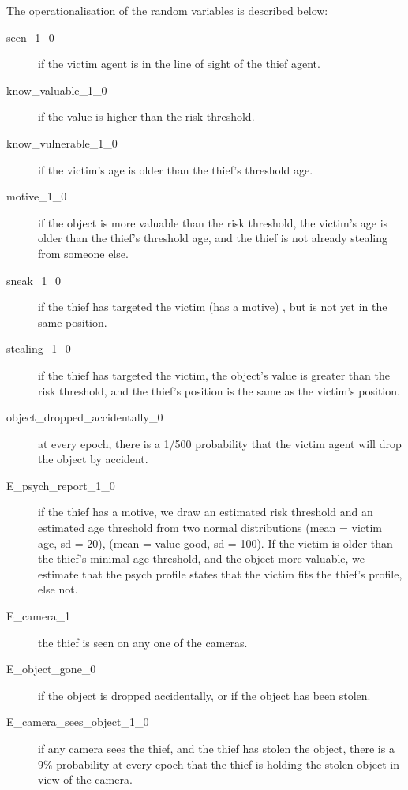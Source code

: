 The operationalisation of the random variables is described below:
\begin{description}


\item[seen\_1\_0  ] if the victim agent is in the line of sight of the thief agent.
\item[know\_valuable\_1\_0 ] if the value is higher than the risk threshold.
\item[know\_vulnerable\_1\_0  ] if the victim's age is older than the thief's threshold age.
\item[motive\_1\_0 ] if the object is more valuable than the risk threshold, the victim's age is older than the thief's threshold age, and the thief is not already stealing from someone else. 
\item[sneak\_1\_0 ] if the thief has targeted the victim (has a motive) , but is not yet in the same position.
\item[stealing\_1\_0 ] if the thief has targeted the victim, the object's value is greater than the risk threshold, and the thief's position is the same as the victim's position. 
\item[object\_dropped\_accidentally\_0 ] at every epoch, there is a 1/500 probability that the victim agent will drop the object by accident.
\item[E\_psych\_report\_1\_0 ] if the thief has a motive, we draw an estimated risk threshold and an estimated age threshold from two normal distributions (mean = victim age, sd = 20), (mean = value good, sd = 100). If the victim is older than the thief's minimal age threshold, and the object more valuable, we estimate that the psych profile states that the victim fits the thief's profile, else not.
\item[E\_camera\_1 ] the thief is seen on any one of the cameras.
\item[E\_object\_gone\_0 ] if the object is dropped accidentally, or if the object has been stolen.
\item[E\_camera\_sees\_object\_1\_0 ]  if any camera sees the thief, and the thief has stolen the object, there is a 9\% probability at every epoch that the thief is holding the stolen object in view of the camera.

\end{description}


